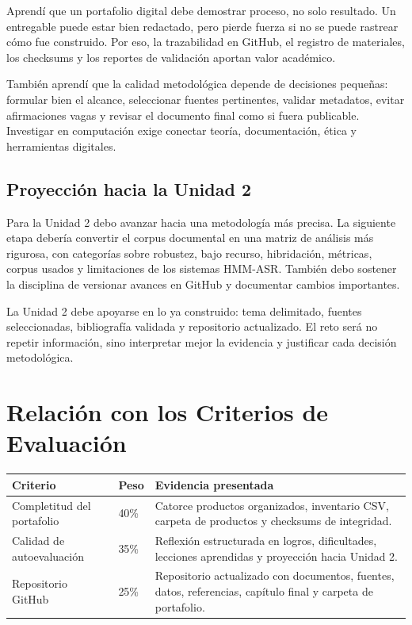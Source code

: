 \documentclass[11pt,a4paper]{article}
\begin{document}
Aprendí que un portafolio digital debe demostrar proceso, no solo resultado. Un entregable puede estar bien redactado, pero pierde fuerza si no se puede rastrear cómo fue construido. Por eso, la trazabilidad en GitHub, el registro de materiales, los checksums y los reportes de validación aportan valor académico.

También aprendí que la calidad metodológica depende de decisiones pequeñas: formular bien el alcance, seleccionar fuentes pertinentes, validar metadatos, evitar afirmaciones vagas y revisar el documento final como si fuera publicable. Investigar en computación exige conectar teoría, documentación, ética y herramientas digitales.

\subsection{Proyección hacia la Unidad 2}

Para la Unidad 2 debo avanzar hacia una metodología más precisa. La siguiente etapa debería convertir el corpus documental en una matriz de análisis más rigurosa, con categorías sobre robustez, bajo recurso, hibridación, métricas, corpus usados y limitaciones de los sistemas HMM-ASR. También debo sostener la disciplina de versionar avances en GitHub y documentar cambios importantes.

La Unidad 2 debe apoyarse en lo ya construido: tema delimitado, fuentes seleccionadas, bibliografía validada y repositorio actualizado. El reto será no repetir información, sino interpretar mejor la evidencia y justificar cada decisión metodológica.

\section{Relación con los Criterios de Evaluación}

\begin{tabularx}{\textwidth}{|L{0.31\textwidth}|C{0.14\textwidth}|Y|}
\hline
\textbf{Criterio} & \textbf{Peso} & \textbf{Evidencia presentada} \\ \hline
Completitud del portafolio & 40\% & Catorce productos organizados, inventario CSV, carpeta de productos y checksums de integridad. \\ \hline
Calidad de autoevaluación & 35\% & Reflexión estructurada en logros, dificultades, lecciones aprendidas y proyección hacia Unidad 2. \\ \hline
Repositorio GitHub & 25\% & Repositorio actualizado con documentos, fuentes, datos, referencias, capítulo final y carpeta de portafolio. \\ \hline
\end{tabularx}
\end{document}
